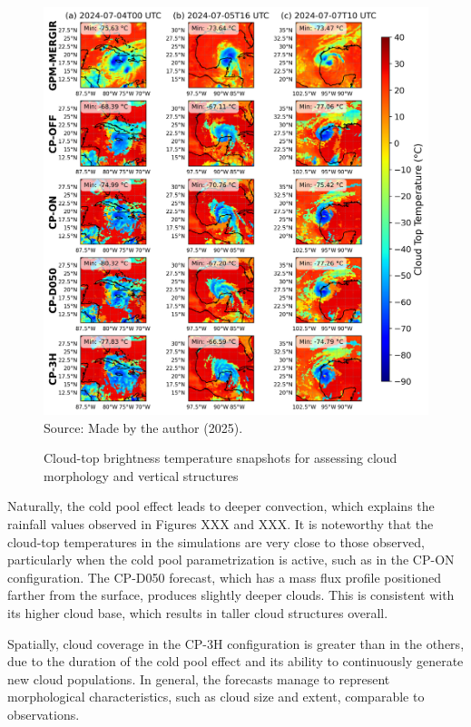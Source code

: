 \begin{figure}[!ht]
	\centering
	\caption{Cloud-top brightness temperature snapshots for assessing cloud morphology and vertical structures} %
	\includegraphics[width=\textwidth]{docs/figuras/chapter5/painel_ctt_selected_experiments_FINAL.png} 
	\vspace{0.5em}
	Source: Made by the author (2025).  %
	\label{fig:snapmorph} %
\end{figure}

Naturally, the cold pool effect leads to deeper convection, which explains the rainfall values observed in Figures XXX and XXX. It is noteworthy that the cloud-top temperatures in the simulations are very close to those observed, particularly when the cold pool parametrization is active, such as in the CP-ON configuration. The CP-D050 forecast, which has a mass flux profile positioned farther from the surface, produces slightly deeper clouds. This is consistent with its higher cloud base, which results in taller cloud structures overall.

Spatially, cloud coverage in the CP-3H configuration is greater than in the others, due to the duration of the cold pool effect and its ability to continuously generate new cloud populations. In general, the forecasts manage to represent morphological characteristics, such as cloud size and extent, comparable to observations.

